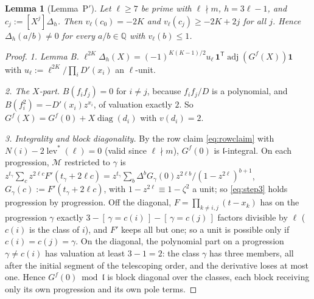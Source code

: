 \documentclass[11pt]{amsart}
\newtheorem{lemma}[theorem]{Lemma}
\theoremstyle{definition}
\theoremstyle{remark}
\numberwithin{equation}{section}
\newcommand{\QQ}{\mathbb{Q}}
\newcommand{\cM}{\mathcal{M}}
\newcommand{\fl}{\mathfrak{l}}
\newcommand{\one}{\mathbf{1}}
\newcommand{\ind}[1]{[\,#1\,]}
\newcommand{\lev}{\operatorname{lev}^{*}}
\newcommand{\adj}{\operatorname{adj}}
\begin{document}
\begin{lemma}[Lemma~P$'$]\label{lem:P}
Let $\ell\ge7$ be prime with $\ell\nmid m$, $h=3\ell-1$, and $c_j:=[X^j]\Delta_h$. Then $v_\ell(c_0)=-2K$ and
$v_\ell(c_j)\ge-2K+2j$ for all $j$. Hence $\Delta_h(a/b)\ne0$ for every $a/b\in\QQ$ with $v_\ell(b)\le1$.
\end{lemma}

\begin{proof}
\emph{1. Lemma B.} $\ell^{2K}\Delta_h(X)=(-1)^{K(K-1)/2}u_\ell\,\one^{\mathsf T}\adj(G^f(X))\one$ with
$u_\ell:=\ell^{2K}/\prod_iD'(x_i)$ an $\ell$-unit.

\emph{2. The $X$-part.} $B(f_if_j)=0$ for $i\ne j$, because $f_if_j/D$ is a polynomial, and $B(f_i^2)=-D'(x_i)z^{x_i}$, of
valuation exactly $2$. So $G^f(X)=G^f(0)+X\operatorname{diag}(d_i)$ with $v(d_i)=2$.

\emph{3. Integrality and block diagonality.} By the row claim \eqref{eq:rowclaim} with $N(i)-2\lev(\ell)=0$ (valid since
$\ell\nmid m$), $G^f(0)$ is $\fl$-integral. On each progression, $\cM$ restricted to $\gamma$ is
$z^{t_\gamma}\sum_c z^{2\ell c}F'(t_\gamma+2\ell c)=z^{t_\gamma}\sum_b\Delta^bG_\gamma(0)z^{2\ell b}/(1-z^{2\ell})^{b+1}$,
$G_\gamma(c):=F'(t_\gamma+2\ell c)$, with $1-z^{2\ell}\equiv1-\zeta^2$ a unit; so \eqref{eq:step3} holds progression by
progression. Off the diagonal, $F=\prod_{k\ne i,j}(t-x_k)$ has on the progression $\gamma$ exactly
$3-\ind{\gamma=c(i)}-\ind{\gamma=c(j)}$ factors divisible by $\ell$ ($c(i)$ is the class of $i$), and $F'$ keeps all but
one; so a unit is possible only if $c(i)=c(j)=\gamma$. On the diagonal, the polynomial part on a progression
$\gamma\ne c(i)$ has valuation at least $3-1=2$: the class $\gamma$ has three members, all after the initial segment of
the telescoping order, and the derivative loses at most one. Hence $G^f(0)\bmod\fl$ is block diagonal over the
classes, each block receiving only its own progression and its own pole terms.


\end{proof}
\end{document}
